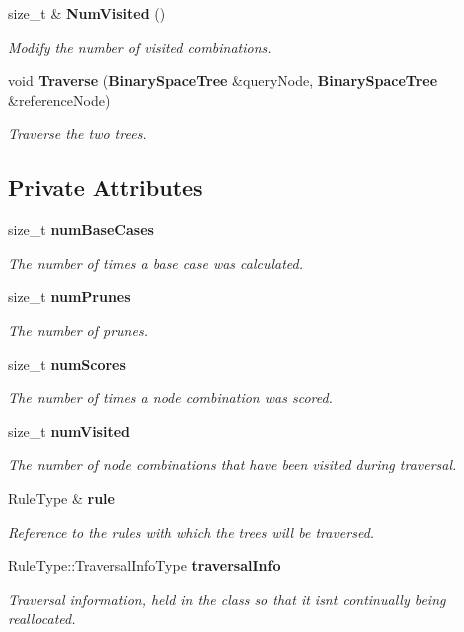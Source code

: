 \begin{DoxyCompactItemize}
size\+\_\+t \& {\bf Num\+Visited} ()
\begin{DoxyCompactList}\small\item\em Modify the number of visited combinations. \end{DoxyCompactList}\item 
void {\bf Traverse} ({\bf Binary\+Space\+Tree} \&query\+Node, {\bf Binary\+Space\+Tree} \&reference\+Node)
\begin{DoxyCompactList}\small\item\em Traverse the two trees. \end{DoxyCompactList}\end{DoxyCompactItemize}
\subsection*{Private Attributes}
\begin{DoxyCompactItemize}
\item 
size\+\_\+t {\bf num\+Base\+Cases}
\begin{DoxyCompactList}\small\item\em The number of times a base case was calculated. \end{DoxyCompactList}\item 
size\+\_\+t {\bf num\+Prunes}
\begin{DoxyCompactList}\small\item\em The number of prunes. \end{DoxyCompactList}\item 
size\+\_\+t {\bf num\+Scores}
\begin{DoxyCompactList}\small\item\em The number of times a node combination was scored. \end{DoxyCompactList}\item 
size\+\_\+t {\bf num\+Visited}
\begin{DoxyCompactList}\small\item\em The number of node combinations that have been visited during traversal. \end{DoxyCompactList}\item 
Rule\+Type \& {\bf rule}
\begin{DoxyCompactList}\small\item\em Reference to the rules with which the trees will be traversed. \end{DoxyCompactList}\item 
Rule\+Type\+::\+Traversal\+Info\+Type {\bf traversal\+Info}
\begin{DoxyCompactList}\small\item\em Traversal information, held in the class so that it isn\textquotesingle{}t continually being reallocated. \end{DoxyCompactList}\end{DoxyCompactItemize}


